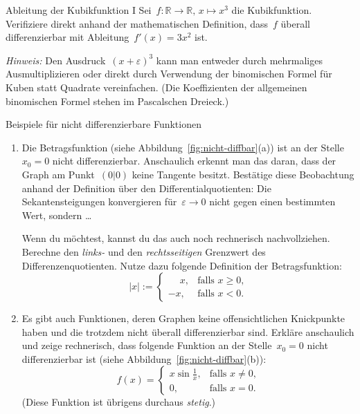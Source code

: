 \documentclass[twoside]{../zirkelblatt}
\newcommand{\RR}{\mathbb{R}}
\theoremstyle{definition}
\theoremstyle{plain}
\theoremstyle{remark}
\begin{document}
\begin{aufgabeShaded}{Ableitung der Kubikfunktion I}
Sei~$f : \RR \to \RR,\,x \mapsto x^3$ die Kubikfunktion. Verifiziere direkt
anhand der mathematischen Definition, dass~$f$ überall differenzierbar mit
Ableitung~$f'(x) = 3x^2$ ist.

\emph{Hinweis:} Den Ausdruck~$(x + \varepsilon)^3$ kann man entweder durch
mehrmaliges Ausmultiplizieren oder direkt durch Verwendung der binomischen
Formel für Kuben statt Quadrate vereinfachen. (Die Koeffizienten der
allgemeinen binomischen Formel stehen im Pascalschen Dreieck.)
\end{aufgabeShaded}

\begin{aufgabeShaded}{Beispiele für nicht differenzierbare Funktionen}
\label{aufg:nichtdb}
\begin{enumerate}
\item Die Betragsfunktion (siehe Abbildung~\ref{fig:nicht-diffbar}(a)) ist an der
Stelle~$x_0 = 0$ nicht differenzierbar. Anschaulich erkennt man das daran, dass
der Graph am Punkt~$(0|0)$ keine Tangente besitzt.\footnotemark{}
Bestätige diese Beobachtung anhand der Definition über den
Differentialquotienten: Die Sekantensteigungen konvergieren für~$\varepsilon
\to 0$ nicht gegen einen bestimmten Wert, sondern \ldots

Wenn du möchtest, kannst du das auch noch rechnerisch nachvollziehen. Berechne
den \emph{links-} und den \emph{rechtsseitigen} Grenzwert des
Differenzenquotienten. Nutze dazu folgende Definition der Betragsfunktion:
\[ |x| := \begin{cases}\phantom{-}x, & \text{falls $x \geq 0$,} \\ -x, & \text{falls $x <
0$.}\end{cases} \]
\item Es gibt auch Funktionen, deren Graphen keine offensichtlichen
Knickpunkte haben und die trotzdem nicht überall differenzierbar sind. Erkläre
anschaulich und zeige rechnerisch, dass folgende Funktion an der Stelle~$x_0 =
0$ nicht differenzierbar ist (siehe Abbildung~\ref{fig:nicht-diffbar}(b)):
\[ f(x) = \begin{cases}x \sin\frac{1}{x}, & \text{falls $x \neq 0$,} \\
0, & \text{falls $x = 0$.}\end{cases} \]
(Diese Funktion ist übrigens durchaus \emph{stetig}.)
\end{enumerate}
\end{aufgabeShaded}
\end{document}
